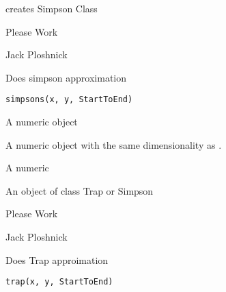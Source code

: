 \documentclass[a4paper]{book}
\begin{document}
%
\begin{Value}
creates Simpson Class
\end{Value}
%
\begin{Note}\relax
Please Work
\end{Note}
%
\begin{Author}\relax
Jack Ploshnick
\end{Author}
%
\begin{SeeAlso}\relax
{}
\end{SeeAlso}
%
\begin{Description}\relax
Does simpson approximation
\end{Description}
%
\begin{Usage}
\begin{verbatim}
simpsons(x, y, StartToEnd)
\end{verbatim}
\end{Usage}
%
\begin{Arguments}
\begin{ldescription}
\item[\code{x}] A numeric object

\item[\code{y}] A numeric object with the same dimensionality as .

\item[\code{StartToEnd}] A numeric
\end{ldescription}
\end{Arguments}
%
\begin{Value}
An object of class Trap or Simpson
\end{Value}
%
\begin{Note}\relax
Please Work
\end{Note}
%
\begin{Author}\relax
Jack Ploshnick
\end{Author}
%
\begin{SeeAlso}\relax
{}
\end{SeeAlso}
%
\begin{Description}\relax
Does Trap approimation
\end{Description}
%
\begin{Usage}
\begin{verbatim}
trap(x, y, StartToEnd)
\end{verbatim}
\end{Usage}
\end{document}

